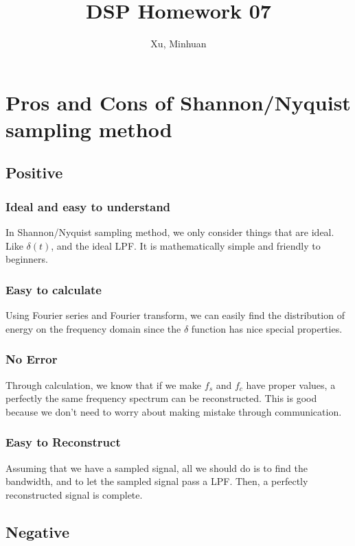 \documentclass{article}
\begin{document}
\title{DSP Homework 07}
\author{Xu, Minhuan}
\maketitle
\tableofcontents
\begin{abstract}

\end{abstract}

\section{Pros and Cons of Shannon/Nyquist sampling method}
\subsection{Positive}
\subsubsection*{Ideal and easy to understand}
In Shannon/Nyquist sampling method, we only consider things that are ideal. Like $\delta(t)$, and the ideal LPF. It is mathematically simple and friendly to beginners.
\subsubsection*{Easy to calculate}
Using Fourier series and Fourier transform, we can easily find the distribution of energy on the frequency domain since the $\delta$ function has nice special properties.

\subsubsection*{No Error}
Through calculation, we know that if we make $f_s$ and $f_c$ have proper values, a perfectly the same frequency spectrum can be reconstructed. This is good because we don't need to worry about making mistake through communication.

\subsubsection*{Easy to Reconstruct}
Assuming that we have a sampled signal, all we should do is to find the bandwidth, and to let the sampled signal pass a LPF. Then, a perfectly reconstructed signal is complete.

\subsection{Negative}
\end{document}
